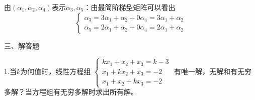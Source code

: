 \documentclass{article}
\begin{document}
\begin{jie}
由$(\alpha_1,\alpha_2,\alpha_4)$表示$\alpha_3,\alpha_5$：由最简阶梯型矩阵可以看出
\begin{equation*}
\begin{cases}
\alpha_3=3\alpha_1+\alpha_2+0\alpha_4=3\alpha_1+\alpha_2\\ \alpha_5=2\alpha_1+\alpha_2+0\alpha_4=2\alpha_1+\alpha_2
\end{cases}
\end{equation*}

\end{jie}

三、解答题

1.当$k$为何值时，线性方程组
$
\begin{cases}
kx_{1}+x_{2}+x_{3}=k-3\\
x_{1}+kx_{2}+x_{3}=-2\\
x_{1}+x_{2}+kx_{3}=-2
\end{cases}
$
有唯一解，无解和有无穷多解？当方程组有无穷多解时求出所有解。
\end{document}
